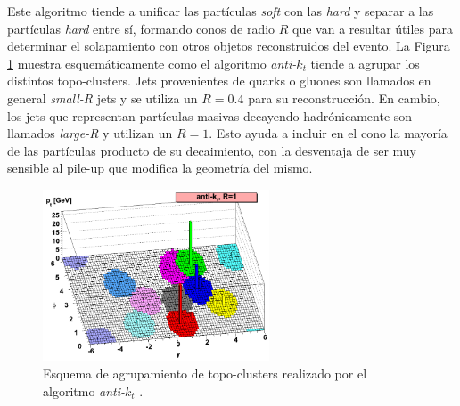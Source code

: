 Este algoritmo tiende a unificar las partículas \textit{soft} con las \textit{hard} y separar a las partículas \textit{hard} entre sí, formando conos de radio $R$ que van a resultar útiles para determinar el solapamiento con otros objetos reconstruidos del evento. La Figura \ref{antikt} muestra esquemáticamente como el algoritmo \textit{anti-$k_t$} tiende a agrupar los distintos topo-clusters. Jets provenientes de quarks o gluones son llamados en general \textit{small-R} jets y se utiliza un $R=0.4$ para su reconstrucción. En cambio, los jets que representan partículas masivas decayendo hadrónicamente son llamados \textit{large-R} y utilizan un $R=1$. Esto ayuda a incluir en el cono la mayoría de las partículas producto de su decaimiento, con la desventaja de ser muy sensible al pile-up que modifica la geometría del mismo.

\begin{figure}
\centering
  \includegraphics[width=0.6\textwidth]{images/objects/antikt.png}
\caption{Esquema de agrupamiento de topo-clusters realizado por el algoritmo \textit{anti-$k_t$} \cite{Cacciari:2008gp}.}
  \label{antikt}
\end{figure}

